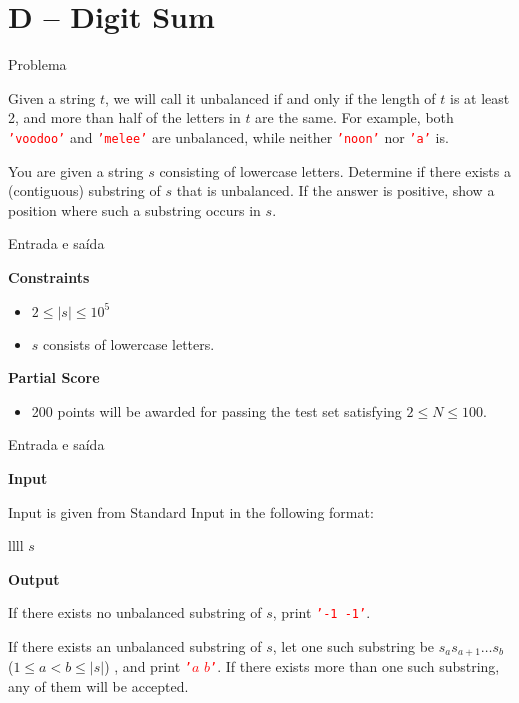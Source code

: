 \section{D -- Digit Sum}

\begin{frame}[fragile]{Problema}

Given a string $t$, we will call it unbalanced if and only if the length of $t$ is at least 2, and
more than half of the letters in $t$ are the same. For example, both
\texttt{\textcolor{red}{'voodoo'}} and \texttt{\textcolor{red}{'melee'}} are unbalanced, while
neither \texttt{\textcolor{red}{'noon'}} nor \texttt{\textcolor{red}{'a'}} is.

You are given a string $s$ consisting of lowercase letters. Determine if there exists a
(contiguous) substring of $s$ that is unbalanced. If the answer is positive, show a position where
such a substring occurs in $s$.

\end{frame}

\begin{frame}[fragile]{Entrada e saída}

\textbf{Constraints}

\begin{itemize}
    \item $2\leq |s| \leq 10^5$
    \item $s$ consists of lowercase letters.
\end{itemize}

\vspace{0.1in}

\textbf{Partial Score}

\begin{itemize}
    \item 200 points will be awarded for passing the test set satisfying $2 \leq N\leq 100$.
\end{itemize}

\end{frame}

\begin{frame}[fragile]{Entrada e saída}

\textbf{Input}

Input is given from Standard Input in the following format:
\begin{atcoderio}{llll}
$s$ \\
\end{atcoderio}

\textbf{Output}

If there exists no unbalanced substring of $s$, print \texttt{\textcolor{red}{'-1 -1'}}.

If there exists an unbalanced substring of $s$, let one such substring be $s_as_{a+1}\ldots s_b$
($1\leq a < b \leq |s|$) , and print {\textcolor{red}{\texttt{'}$a$ $b$\texttt{'}}}. If there exists more than one
such substring, any of them will be accepted.

\end{frame}

